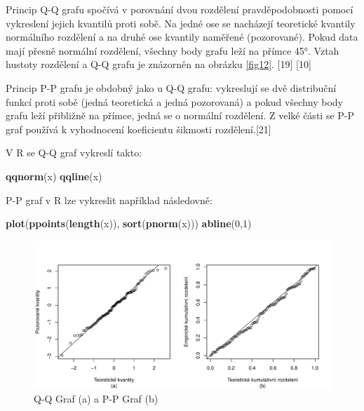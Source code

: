 \documentclass[12pt,]{article}
\newenvironment{Shaded}{\begin{snugshade}}{\end{snugshade}}
\newcommand{\KeywordTok}[1]{\textcolor[rgb]{0.13,0.29,0.53}{\textbf{#1}}}
\newcommand{\DecValTok}[1]{\textcolor[rgb]{0.00,0.00,0.81}{#1}}
\newcommand{\NormalTok}[1]{#1}
\begin{document}
\qquad Princip Q-Q grafu spočívá v porovnání dvou rozdělení
pravděpodobnosti pomocí vykreslení jejich kvantilů proti sobě. Na jedné
ose se nacházejí teoretické kvantily normálního rozdělení a na druhé ose
kvantily naměřené (pozorované). Pokud data mají přesně normální
rozdělení, všechny body grafu leží na přímce 45°. Vztah hustoty
rozdělení a Q-Q grafu je znázorněn na obrázku \ref{fig12}. {[}19{]}
{[}10{]}

\qquad Princip P-P grafu je obdobný jako u Q-Q grafu: vykreslují se dvě
distribuční funkcí proti sobě (jedná teoretická a jedná pozorovaná) a
pokud všechny body grafu leží přibližně na přímce, jedná se o normální
rozdělení. Z velké části se P-P graf používá k vyhodnocení koeficientu
šikmosti rozdělení.{[}21{]}

V R se Q-Q graf vykreslí takto:

\begin{Shaded}
\begin{Highlighting}[]
\KeywordTok{qqnorm}\NormalTok{(x)}
\KeywordTok{qqline}\NormalTok{(x)}
\end{Highlighting}
\end{Shaded}

P-P graf v R lze vykreslit například následovně:

\begin{Shaded}
\begin{Highlighting}[]
\KeywordTok{plot}\NormalTok{(}\KeywordTok{ppoints}\NormalTok{(}\KeywordTok{length}\NormalTok{(x)), }\KeywordTok{sort}\NormalTok{(}\KeywordTok{pnorm}\NormalTok{(x)))}
\KeywordTok{abline}\NormalTok{(}\DecValTok{0}\NormalTok{,}\DecValTok{1}\NormalTok{)}
\end{Highlighting}
\end{Shaded}

\begin{figure}[H]

{\centering \includegraphics{BP_files/figure-latex/pp-qq plots-1} 

}

\caption{\label{fig3} Q-Q Graf (a) a P-P Graf (b)}\label{fig:pp-qq plots}
\end{figure}
\end{document}
